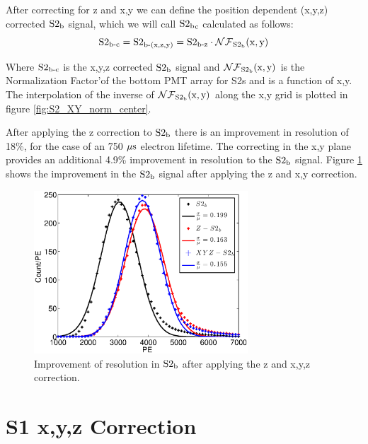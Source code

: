 After correcting for z and x,y we can define the position dependent  (x,y,z) corrected $\rm S2_b$ signal, which we will call $\rm S2{_b}_c$ calculated as follows:
\begin{equation}
\rm S2_{\operatorname{b-c}}= S2_{\operatorname{b-(x,z,y)}}=S2_{\operatorname{b-z}} \cdot \mathcal{NF}_{S2_b}(x,y)
\label{eq:S2_XYZ}
\end{equation}

Where $\rm S2_{\operatorname{b-c}}$ is the x,y,z corrected $\rm S2_b$ signal and $\rm \mathcal{NF}_{S2_b}(x,y)$ is the Normalization Factor'of the bottom PMT array for S2s and is a function of x,y. The interpolation of the inverse of $\rm \mathcal{NF}_{S2_b}(x,y)$ along the x,y grid is plotted in figure \ref{fig:S2_XY_norm_center}.


After applying the z correction to $\rm S2_b$ there is an improvement in resolution of 18\%, for the case of an 750 $\rm \mu s$ electron lifetime. The correcting in the x,y plane provides an additional 4.9\% improvement in resolution to the $\rm S2_b$ signal. Figure \ref{fig:S2_res} shows the improvement in the $\rm S2_b$ signal after applying the z and x,y correction.

\begin{figure}[h!]\centering
\includegraphics[width=80mm]{Chapter_XYZ_Corr/Thesis_Corr_Plots/S2_corr_res.eps}
\caption{Improvement of resolution in $\rm S2_b$ after applying the z and x,y,z correction. }
\label{fig:S2_res}
\end{figure}



\section{S1 x,y,z Correction}

